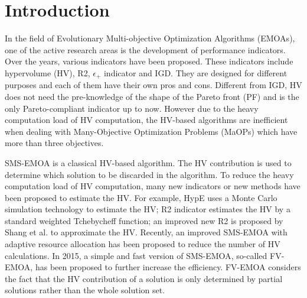 \documentclass[conference]{IEEEtran}
\begin{document}
\section{Introduction}
In the field of Evolutionary Multi-objective Optimization Algorithms (EMOAs), 
one of the active research areas is the development of performance indicators. 
Over the years, various indicators have been proposed. 
These indicators include hypervolume (HV)\cite{hypervolume}, 
R2\cite{R2}, $\epsilon_+$ indicator\cite{e+} and IGD\cite{IGD}.
They are designed for different purposes and each of them have their own pros and cons.
Different from IGD, 
HV does not need the pre-knowledge of the shape of the Pareto front (PF) 
and is the only Pareto-compliant indicator up to now\cite{pareto_compliant}. 
However due to the heavy computation load of HV computation\cite{hypervolume:computationLoad}, 
the HV-based algorithms are inefficient when dealing with Many-Objective Optimization Problems (MaOPs) which have more than three objectives. 

SMS-EMOA\cite{smsemoa} is a classical HV-based algorithm. 
The HV contribution is used to determine which solution to be discarded in the algorithm. 
To reduce the heavy computation load of HV computation, 
many new indicators or new methods have been proposed to estimate the HV. 
For example, HypE uses a Monte Carlo simulation technology to estimate the HV\cite{HypE}; 
R2 indicator estimates the HV by a standard weighted Tchebycheff function\cite{R2}; 
an improved new R2 is proposed by Shang et al.\cite{newR2} to approximate the HV. 
Recently, an improved SMS-EMOA with adaptive resource allocation has been proposed to reduce the number of HV calculations\cite{ismsemoa}.  
In 2015, a simple and fast version of SMS-EMOA\cite{smsemoa}, so-called FV-EMOA, has been proposed\cite{FVEMOA}
to further increase the efficiency.
FV-EMOA considers the fact that 
the HV contribution of a solution is only determined by partial solutions rather than the whole solution set\cite{FVEMOA}. 
\end{document}
